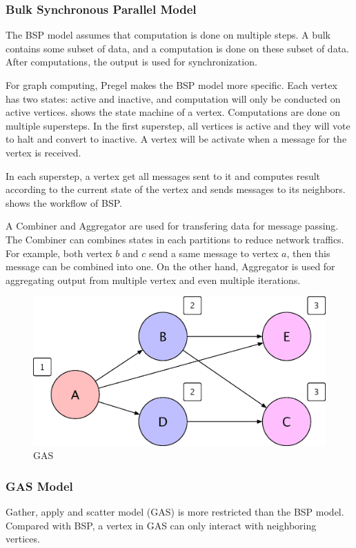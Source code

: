 \subsubsection{Bulk Synchronous Parallel Model}
The BSP model assumes that computation is done on multiple steps. A bulk contains
some subset of data, and a computation is done on these subset of data. After
computations, the output is used for synchronization.

For graph computing, Pregel makes the BSP model more specific.
Each vertex has two states: active and inactive, and computation
will only be conducted on active vertices.  shows the
state machine of a vertex. Computations are done on multiple
supersteps. In the first superstep, all vertices is active and they
will vote to halt and convert to inactive. A vertex will be activate
when a message for the vertex is received.

In each superstep, a vertex get all messages sent to it and computes
result according to the current state of the vertex and sends messages
to its neighbors.  shows the workflow of BSP.

A Combiner and Aggregator are used for transfering data for message
passing. The Combiner can combines states in each partitions to reduce
network traffics. For example, both vertex $b$ and $c$ send a same
message to vertex $a$, then this message can be combined into one.
On the other hand, Aggregator is used for aggregating output from multiple
vertex and even multiple iterations.

\begin{figure}
  \center
  \includegraphics[width=.8\linewidth]{figures/gas}
  \caption{GAS}
  \label{gas}
\end{figure}

\subsubsection{GAS Model}
Gather, apply and scatter model (GAS) is more restricted than the BSP model.
Compared with BSP, a vertex in GAS can only interact with neighboring
vertices.

